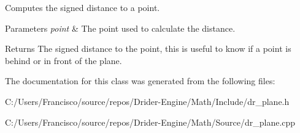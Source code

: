 Computes the signed distance to a point.


\begin{DoxyParams}{Parameters}
{\em point} & The point used to calculate the distance.\\
\hline
\end{DoxyParams}
\begin{DoxyReturn}{Returns}
The signed distance to the point, this is useful to know if a point is behind or in front of the plane. 
\end{DoxyReturn}


The documentation for this class was generated from the following files\+:\begin{DoxyCompactItemize}
\item 
C\+:/\+Users/\+Francisco/source/repos/\+Drider-\/\+Engine/\+Math/\+Include/dr\+\_\+plane.\+h\item 
C\+:/\+Users/\+Francisco/source/repos/\+Drider-\/\+Engine/\+Math/\+Source/dr\+\_\+plane.\+cpp\end{DoxyCompactItemize}
